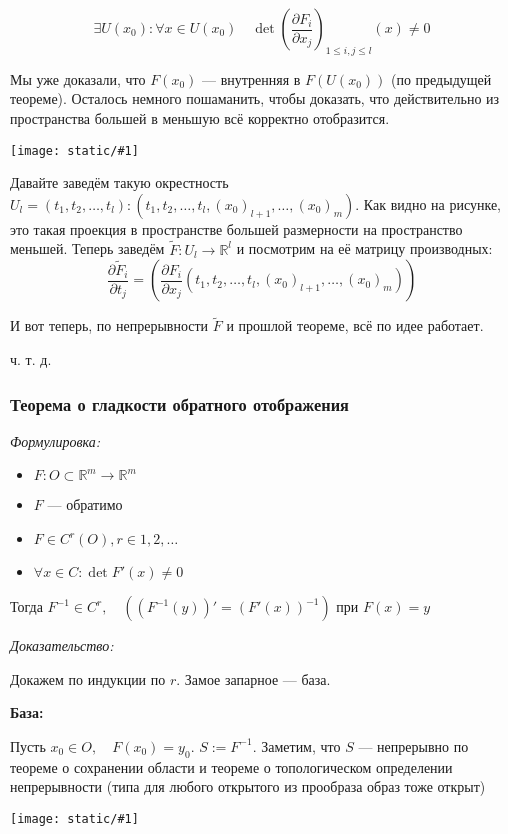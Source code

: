 \documentclass{article}
\def\image#1{\texttt{[image: static/\#1]}}
\begin{document}
\[\exists U(x_0): \forall x \in U(x_0) \quad \det \left(\frac{\partial F_i}{\partial x_j}\right)_{1 \le i, j \le l}(x) \neq 0\]

Мы уже доказали, что $F(x_0)$ --- внутренняя в $F(U(x_0))$ (по предыдущей теореме). Осталось немного пошаманить, чтобы доказать, что действительно из пространства большей в меньшую всё корректно отобразится.

\image{sohr_obl_men_raz.png}

Давайте заведём такую окрестность $U_l = {(t_1, t_2, \ldots, t_l): (t_1, t_2, \ldots, t_l, (x_0)_{l + 1}, \ldots, (x_0)_m)}$. Как видно на рисунке, это такая проекция в пространстве большей размерности на пространство меньшей. Теперь заведём $\widetilde{F}: U_l \rightarrow \mathbb{R}^l$ и посмотрим на её матрицу производных: $$\frac{\partial \widetilde{F}_i}{\partial t_j} = \left(\frac{\partial F_i}{\partial x_j}(t_1, t_2, \ldots, t_l, (x_0)_{l + 1}, \ldots, (x_0)_m)\right)$$

И вот теперь, по непрерывности $\widetilde{F}$ и прошлой теореме, всё по идее работает.

ч. т. д.

\subsubsection{Теорема о гладкости обратного отображения}
\textit{Формулировка:}

\begin{itemize}
    \item $F: O \subset \mathbb{R}^m \rightarrow \mathbb{R}^m$
    \item $F$ --- обратимо
    \item $F \in C^r(O), r \in 1, 2, \ldots$
    \item $\forall x \in C: \det F'(x) \neq 0$
\end{itemize}

Тогда $F^{-1} \in C^r, \quad ((F^{-1}(y))' = (F'(x))^{-1})$ при $F(x) = y$

\textit{Доказательство:}

Докажем по индукции по $r$. Замое запарное --- база.

\textbf{База:}

Пусть $x_0 \in O, \quad F(x_0) = y_0$. $S := F^{-1}$. Заметим, что $S$ --- непрерывно по теореме о сохранении области и теореме о топологическом определении непрерывности (типа для любого открытого из прообраза образ тоже открыт)

\image{glad_obr.png}
\end{document}
